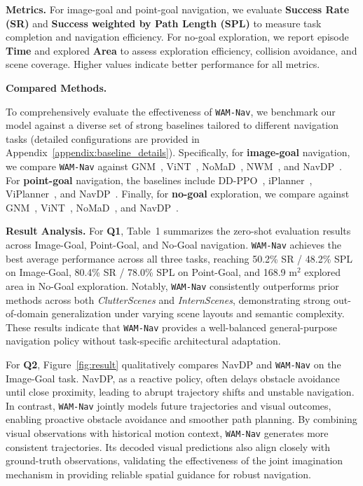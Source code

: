 \documentclass{article}
\begin{document}
\noindent\textbf{Metrics.}
For image-goal and point-goal navigation, we evaluate \textbf{Success Rate (SR)} and \textbf{Success weighted by Path Length (SPL)} to measure task completion and navigation efficiency. For no-goal exploration, we report episode \textbf{Time} and explored \textbf{Area} to assess exploration efficiency, collision avoidance, and scene coverage. Higher values indicate better performance for all metrics.

\noindent\textbf{Compared Methods.}

To comprehensively evaluate the effectiveness of \texttt{WAM-Nav}, we benchmark our model against a diverse set of strong baselines tailored to different navigation tasks (detailed configurations are provided in Appendix~\ref{appendix:baseline_details}). Specifically, for \textbf{image-goal} navigation, we compare \texttt{WAM-Nav} against GNM~\citep{shah2023gnm}, ViNT~\citep{shah2023vint}, NoMaD~\citep{sridhar2024nomad}, NWM~\citep{bar2025nwm}, and NavDP~\citep{cai2025navdp}. For \textbf{point-goal} navigation, the baselines include DD-PPO~\citep{wijmans2020ddppo}, iPlanner~\citep{yang2023iplanner}, ViPlanner~\citep{roth2024viplanner}, and NavDP~\citep{cai2025navdp}. Finally, for \textbf{no-goal} exploration, we compare against GNM~\citep{shah2023gnm}, ViNT~\citep{shah2023vint}, NoMaD~\citep{sridhar2024nomad}, and NavDP~\citep{cai2025navdp}.

\noindent\textbf{Result Analysis.}
For \textbf{Q1}, Table~1 summarizes the zero-shot evaluation results across Image-Goal, Point-Goal, and No-Goal navigation. \texttt{WAM-Nav} achieves the best average performance across all three tasks, reaching 50.2\% SR / 48.2\% SPL on Image-Goal, 80.4\% SR / 78.0\% SPL on Point-Goal, and 168.9 m$^2$ explored area in No-Goal exploration. Notably, \texttt{WAM-Nav} consistently outperforms prior methods across both \textit{ClutterScenes} and \textit{InternScenes}, demonstrating strong out-of-domain generalization under varying scene layouts and semantic complexity. These results indicate that \texttt{WAM-Nav} provides a well-balanced general-purpose navigation policy without task-specific architectural adaptation.

For \textbf{Q2}, Figure~\ref{fig:result} qualitatively compares NavDP and \texttt{WAM-Nav} on the Image-Goal task. NavDP, as a reactive policy, often delays obstacle avoidance until close proximity, leading to abrupt trajectory shifts and unstable navigation. In contrast, \texttt{WAM-Nav} jointly models future trajectories and visual outcomes, enabling proactive obstacle avoidance and smoother path planning. By combining visual observations with historical motion context, \texttt{WAM-Nav} generates more consistent trajectories. Its decoded visual predictions also align closely with ground-truth observations, validating the effectiveness of the joint imagination mechanism in providing reliable spatial guidance for robust navigation.
\end{document}
